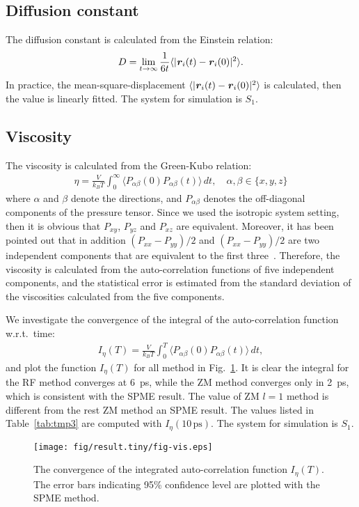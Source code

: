 \documentclass[aip,jcp,a4paper,preprint,unsortedaddress,onecolumn,fleqn]{revtex4-1}
\newcommand{\vect}[1]{\textbf{\textit{#1}}}
\newcommand{\systemsb}{S_1}
\begin{document}
\subsection{Diffusion constant}
The diffusion constant is calculated from the Einstein relation:
\begin{align}
  D = \lim_{t\rightarrow \infty}\frac {1}{6t} \langle \vert \vect r_i(t) - \vect r_i(0)\vert^2\rangle.
\end{align}
In practice, the mean-square-displacement $\langle\vert \vect r_i(t) - \vect
r_i(0)\vert^2\rangle$ is calculated, then the value is linearly fitted. The system for simulation is $\systemsb$.

\subsection{Viscosity}
The viscosity is calculated from the Green-Kubo relation:
\begin{align}
  \eta = \frac{V}{k_BT}\int_0^\infty\langle P_{\alpha\beta}(0) P_{\alpha\beta}(t)\rangle\,dt, \quad \alpha,\beta \in \{x, y, z\}
\end{align}
where $\alpha$ and $\beta$ denote the directions, and
$P_{\alpha\beta}$ denotes the off-diagonal components of the pressure
tensor. Since we used the isotropic system setting, then it is obvious
that $P_{xy}$, $P_{yz}$ and $P_{xz}$ are equivalent. Moreover, it has
been pointed out that in addition $(P_{xx} - P_{yy})/2$ and $(P_{xx} -
P_{yy})/2$ are two independent components that are equivalent to the
first three~\cite{alfe1998first}. Therefore, the viscosity is
calculated from the auto-correlation functions of five independent
components, and the statistical error is estimated from the standard
deviation of the viscosities calculated from the five components.

We investigate the convergence of the integral of the auto-correlation function w.r.t.~time:
\begin{align}
  I_\eta(T) = \frac{V}{k_BT}\int_0^T\langle P_{\alpha\beta}(0) P_{\alpha\beta}(t)\rangle\,dt,
\end{align}
and plot the function $I_\eta(T) $ for all method in
Fig.~\ref{fig:conv-vis}.  It is clear the integral for the RF method
converges at 6~ps, while the ZM method converges only in 2~ps, which
is consistent with the SPME result.  The value of ZM $l=1$ method is
different from the rest ZM method an SPME result.
The values listed  in Table~\ref{tab:tmp3} are computed with $I_\eta(10\,\textrm{ps})$.
The
system for simulation is $\systemsb$.

\begin{figure}
  \centering
  \texttt{[image: fig/result.tiny/fig-vis.eps]}
  \caption{The convergence of the integrated auto-correlation function $I_\eta(T) $. The error bars indicating 95\% confidence level are plotted with the SPME method.}
  \label{fig:conv-vis}
\end{figure}


\newpage
{}

\end{document}
